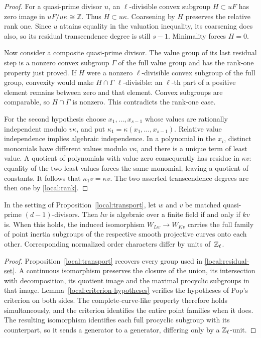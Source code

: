 \begin{proof}
For a quasi-prime divisor $u$, an $\ell$-divisible convex subgroup
$H\subset uF$ has zero image in $uF/u\kappa\cong\mathbb Z$.
Thus $H\subset u\kappa$.  Coarsening by $H$ preserves the relative
rank one.  Since $u$ attains equality in the valuation inequality,
its coarsening does also, so its residual transcendence degree is
still $s-1$.  Minimality forces $H=0$.

Now consider a composite quasi-prime divisor.  The value group of
its last residual step is a nonzero convex subgroup $\Gamma$ of
the full value group and has the rank-one property just proved.
If $H$ were a nonzero $\ell$-divisible convex subgroup of the full
group, convexity would make $H\cap\Gamma$ $\ell$-divisible: an
$\ell$-th part of a positive element remains between zero and that
element.  Convex subgroups are comparable, so $H\cap\Gamma$ is
nonzero.  This contradicts the rank-one case.

For the second hypothesis choose $x_1,\ldots,x_{s-1}$ whose values
are rationally independent modulo $v\kappa$, and put
$\kappa_1=\kappa(x_1,\ldots,x_{s-1})$.
Relative value independence implies algebraic independence.  In a
polynomial in the $x_i$, distinct monomials have different values
modulo $v\kappa$, and there is a unique term of least value.
A quotient of polynomials with value zero consequently has residue
in $\kappa v$: equality of the two least values forces the same
monomial, leaving a quotient of constants.  It follows that
$\kappa_1v=\kappa v$.  The two asserted transcendence degrees are
then one by \eqref{local:rank}.
\end{proof}

\begin{proposition}\label{local:curves}
In the setting of Proposition~\ref{local:transport}, let
$w$ and $v$ be matched quasi-prime $(d-1)$-divisors.
Then $lw$ is algebraic over a finite field if and only if $kv$ is.
When this holds, the induced isomorphism $W_{Lw}\to W_{Kv}$ carries
the full family of point inertia subgroups of the respective smooth
projective curves onto each other.  Corresponding normalized order
characters differ by units of~$\mathbb Z_\ell$.
\end{proposition}

\begin{proof}
Proposition~\ref{local:transport} recovers every group used in
\eqref{local:residual-set}.  A continuous isomorphism preserves the
closure of the union, its intersection with decomposition, its
quotient image and the maximal procyclic subgroups in that image.
Lemma~\ref{local:criterion-hypotheses} verifies the hypotheses of
Pop's criterion on both sides.  The complete-curve-like property
therefore holds simultaneously, and the criterion identifies the
entire point families when it does.  The resulting isomorphism
identifies each full procyclic subgroup with its counterpart, so it
sends a generator to a generator, differing only by a $\mathbb Z_\ell$-unit.
\end{proof}

